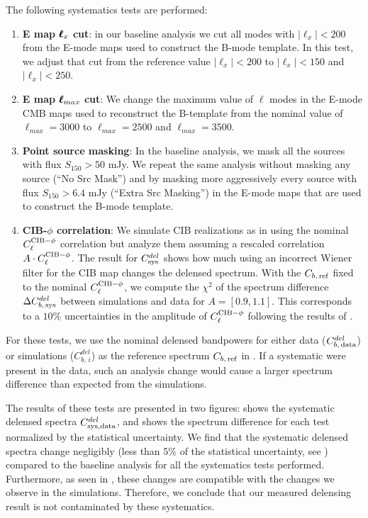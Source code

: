 The following systematics tests are performed:
\begin{enumerate}[leftmargin=0.5cm]
  \item{\textbf{E map $\pmb{\ell}_x$ cut}: in our baseline analysis we cut all modes with $|\ell_x| < 200$ from the E-mode maps used to construct the B-mode template.
 In this test, we adjust that cut from the reference value $|\ell_x| < 200$ to $|\ell_x| < 150$ and $|\ell_x| < 250$.
}
  \item{\textbf{E map $\pmb{\ell}_{max}$ cut}: We change the maximum value of $\ell$ modes in the E-mode CMB maps used to reconstruct the B-template from the nominal value of $\ell_{max}=3000$ to $\ell_{max}=2500$ and $\ell_{max}=3500$.}

  \item{\textbf{Point source masking}: In the baseline analysis, we mask all the sources with flux $S_{150}>50$ mJy.
    We repeat the same analysis without masking any source (``No Src Mask'') and by masking more aggressively every source with flux $S_{150}>6.4$ mJy (``Extra Src Masking'') in the E-mode maps that are used to construct the B-mode template.
}

\item{\textbf{CIB-$\phi$ correlation}:
We simulate CIB realizations as in  using the nominal $C_{\ell}^{\rm{CIB}-\phi}$ correlation but analyze them assuming a rescaled correlation $A \cdot C_{\ell}^{\rm{CIB}-\phi}$.
The result for $C^{del}_{\rm sys}$ shows how much using an incorrect Wiener filter for the CIB map changes the delensed spectrum.
With the $C_{b,\,{\rm ref}}$ fixed to the nominal $C_{\ell}^{\rm{CIB}-\phi}$, we compute the $\chi^2$ of the spectrum difference
$\Delta C^{del}_{b,\,{\rm sys}}$ between simulations and data for $A=[0.9,1.1]$. This corresponds to a $10\%$ uncertainties in the amplitude of $C_{\ell}^{\rm{CIB}-\phi}$ following the results of \citet{planck2013XVIII}.
}
\end{enumerate}
For these tests, we use the nominal delensed bandpowers for either data ($C^{del}_{b,\,{\rm data}}$) or simulations ($C^{del}_{b,\,i}$) as the reference spectrum $C_{b,\,{\rm ref}}$ in .
If a systematic were present in the data, such an analysis change would cause a larger spectrum difference than expected from the simulations.

The results of these tests are presented in two figures:  shows the systematic delensed spectra $C^{del}_{\rm sys, data}$, and  shows the spectrum difference for each test normalized by the statistical uncertainty.
We find that the systematic delensed spectra change negligibly (less than 5\% of the statistical uncertainty, see ) compared to the baseline analysis for all the systematics tests performed.
Furthermore, as seen in , these changes are compatible with the changes we observe in the simulations.
Therefore, we conclude that our measured delensing result is not contaminated by these systematics.


